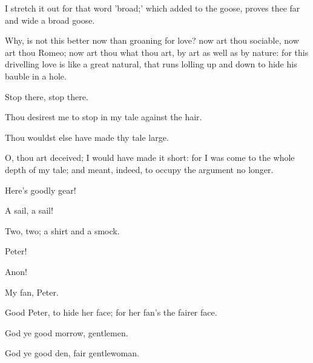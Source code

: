 \begin{speech}
I stretch it out for that word 'broad;'
which added to the goose, proves thee far and
wide a broad goose.
\end{speech}
\begin{speech}
Why, is not this better now than
groaning for love? now art thou sociable, now
art thou Romeo; now art thou what thou art,
by art as well as by nature: for this drivelling
love is like a great natural, that runs lolling up
and down to hide his bauble in a hole.
\end{speech}
\begin{speech}
Stop there, stop there.
\end{speech}
\begin{speech}
Thou desirest me to stop in my tale
against the hair.
\end{speech}
\begin{speech}
Thou wouldst else have made thy
tale large.
\end{speech}
\begin{speech}
O, thou art deceived; I would have
made it short: for I was come to the whole
depth of my tale; and meant, indeed, to occupy
the argument no longer.
\end{speech}
\begin{speech}
Here's goodly gear! 
\end{speech}
\begin{speech}
A sail, a sail!
\end{speech}
\begin{speech}
Two, two; a shirt and a smock.
\end{speech}
\begin{speech}
Peter!
\end{speech}
\begin{speech}
Anon!
\end{speech}
\begin{speech}
My fan, Peter.
\end{speech}
\begin{speech}
Good Peter, to hide her face; for
her fan's the fairer face.
\end{speech}
\begin{speech}
God ye good morrow, gentlemen.
\end{speech}
\begin{speech}
God ye good den, fair gentlewoman.
\end{speech}
